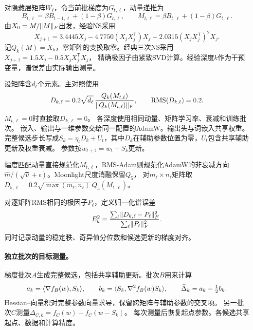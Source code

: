 对隐藏层矩阵$W_\ell$，令当前批梯度为$G_{t,\ell}$，动量递推为
\begin{equation}
 B_{t,\ell}=\beta B_{t-1,\ell}+(1-\beta)G_{t,\ell},\qquad
 M_{t,\ell}=\beta B_{t,\ell}+(1-\beta)G_{t,\ell}.
\end{equation}
由$X_0=M/\lVert M\rVert_F$出发，经验NS采用
\begin{equation}\label{eq:v2ns}
 X_{j+1}=3.4445X_j-4.7750(X_jX_j^{\mathsf T})X_j
              +2.0315(X_jX_j^{\mathsf T})^2X_j.
\end{equation}
记$Q_k(M)=X_k$，零矩阵的变换取零。经典三次NS采用$X_{j+1}=1.5X_j-0.5X_jX_j^{\mathsf T}X_j$，
精确极因子由紧致SVD计算。经验深度$k$作为干预变量，谱误差由实际输出测量。

设矩阵含$d_\ell$个元素。主对照使用
\begin{equation}\label{eq:v2rms}
 D_{k,\ell}=0.2\sqrt{d_\ell}\,
       \frac{Q_k(M_{t,\ell})}{\lVert Q_k(M_{t,\ell})\rVert_F},
 \qquad \operatorname{RMS}(D_{k,\ell})=0.2.
\end{equation}
$M_{t,\ell}=0$时直接取$D_{k,\ell}=0$。
各深度使用相同动量、矩阵学习率、衰减和训练批次。
嵌入、输出与一维参数交给同一配置的AdamW\citep{loshchilov2019adamw}。输出头与词嵌入共享权重。
完整候选步长写成$S_k=\eta_t D_k+U_t$，其中$D_k$在辅助参数位置为零，$U_t$包含共享辅助更新及权重衰减。
参数按$w_{t+1}=w_t-S_k$更新。

幅度匹配动量直接规范化$M_{t,\ell}$，RMS-Adam则规范化AdamW的非衰减方向
$\widehat m/(\sqrt{\widehat v}+\epsilon)$。Moonlight尺度消融保留$Q_5$，
对$m_\ell\times n_\ell$矩阵取$D_{5,\ell}=0.2\sqrt{\max(m_\ell,n_\ell)}\,Q_5(M_{t,\ell})$\citep{liu2025scalable}。

对逐矩阵RMS相同的极因子$P_\ell$，定义归一化谱误差
\begin{equation}
 E_k^2=\frac{\sum_\ell\lVert D_{k,\ell}-P_\ell\rVert_F^2}
                  {\sum_\ell\lVert P_\ell\rVert_F^2}.
\end{equation}
同时记录动量的稳定秩、奇异值分位数和候选更新的梯度对齐。

\paragraph{独立批次的目标测量。}
梯度批次$A$生成完整候选，包括共享辅助更新。批次$B$用来计算
\begin{equation}\label{eq:v2scores}
 a_k=\langle \nabla f_B(w),S_k\rangle,\qquad
 b_k=\langle S_k,\nabla^2f_B(w)S_k\rangle,\qquad
 \widehat\Delta_k=a_k-\tfrac12b_k.
\end{equation}
Hessian--向量积对完整参数向量求导，保留跨矩阵与辅助参数的交叉项。
另一批次$C$测量$\Delta_{C,k}=f_C(w)-f_C(w-S_k)$。
每次测量后恢复起点参数。各候选共享起点、数据和计算精度。

